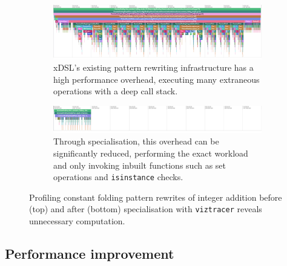 \begin{figure}[H]
    \centering
    \begin{subfigure}[b]{\textwidth}
        \centering
        \includegraphics[width=\textwidth]{images/specialising_optimising_xdsl_rewriting/custom_constant_fold_scale.png}
        \captionsetup{width=0.8\textwidth}
        \caption{xDSL's existing pattern rewriting infrastructure has a high performance overhead, executing many extraneous operations with a deep call stack.}
        \label{fig:constant-fold-original-viztracer}
    \end{subfigure}
    \begin{subfigure}[b]{\textwidth}
        \centering
        \includegraphics[width=\textwidth]{images/specialising_optimising_xdsl_rewriting/optimised_constant_fold_scale.png}
        \captionsetup{width=0.8\textwidth}
        \caption{Through specialisation, this overhead can be significantly reduced, performing the exact workload and only invoking inbuilt functions such as set operations and \texttt{isinstance} checks.}
        \label{fig:constant-fold-optimised-viztracer}
    \end{subfigure}
    \caption{Profiling constant folding pattern rewrites of integer addition before (top) and after (bottom) specialisation with \texttt{viztracer} reveals unnecessary computation.}
    \label{fig:constant-fold-viztracer}
\end{figure}


\subsection{Performance improvement}
\label{sec:specialising-pattern-rewriting-performance}

